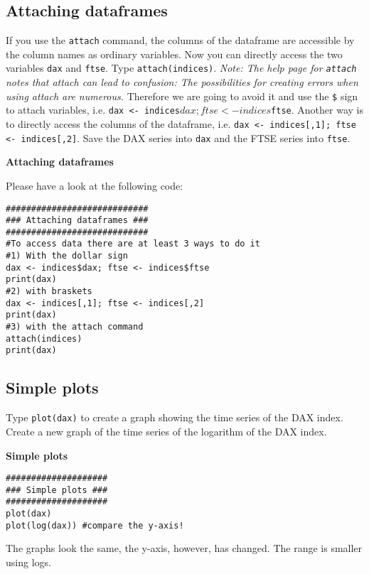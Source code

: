 \documentclass{article}
\begin{document}
\subsection{Attaching dataframes}

If you use the \texttt{attach} command, the columns of the dataframe are accessible by the column names as ordinary variables. Now you can directly access the two variables \texttt{dax} and \texttt{ftse}. Type \texttt{attach(indices)}. \emph{Note: The help page for \texttt{attach} notes that attach can lead to confusion: The possibilities for creating errors when using attach are numerous.} Therefore we are going to avoid it and use the \texttt{\$} sign to attach variables, i.e. \texttt{dax <- indices$dax; ftse <- indices$ftse}. Another way is to directly access the columns of the dataframe, i.e. \texttt{dax <- indices[,1]; ftse <- indices[,2]}. Save the DAX series into \texttt{dax} and the FTSE series into \texttt{ftse}.

\begin{solution}
\textbf{Attaching dataframes}

Please have a look at the following code:
\begin{verbatim}
############################
### Attaching dataframes ###
############################
#To access data there are at least 3 ways to do it
#1) With the dollar sign
dax <- indices$dax; ftse <- indices$ftse
print(dax)
#2) with braskets
dax <- indices[,1]; ftse <- indices[,2]
print(dax)
#3) with the attach command
attach(indices)
print(dax)
\end{verbatim}
\end{solution}

\subsection{Simple plots}

Type \texttt{plot(dax)} to create a graph showing the time series of the DAX index. Create a new graph of the time series of the logarithm of the DAX index.

\begin{solution}
\textbf{Simple plots }

\begin{verbatim}
####################
### Simple plots ###
####################
plot(dax)
plot(log(dax)) #compare the y-axis!
\end{verbatim}
The graphs look the same, the y-axis, however, has changed. The range is smaller using logs.
\end{solution}
\end{document}

